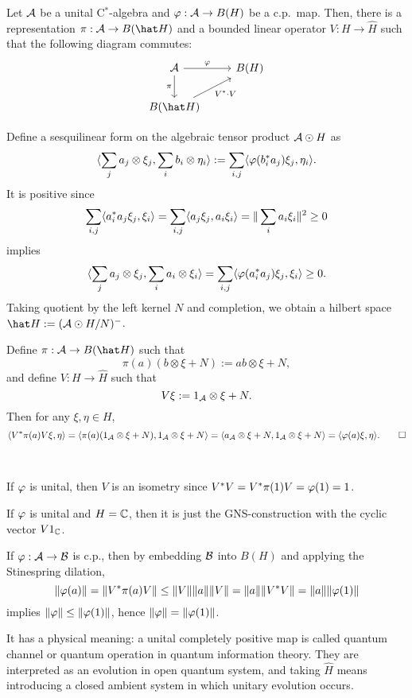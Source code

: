 \documentclass{../../small}
\begin{document}
\begin{thm}
Let $\mathcal{A}$ be a unital C$^*$-algebra and $\varphi:\mathcal{A}\to B(H)$ be a c.p.~map.
Then, there is a representation $\pi:\cA\to B(\hat H)$ and a bounded linear operator $V:H\to\hat H$ such that the following diagram commutes:
\[\begin{tikzcd}
\cA \ar{r}{\f} \ar[swap]{d}{\pi} & B(H) \\
B(\hat H) \ar[swap]{ur}{V^*\cdot V} &
\end{tikzcd}\]
\end{thm}
\begin{pf}
Define a sesquilinear form on the algebraic tensor product $\mathcal{A}\odot H$ as
\[\langle\sum_ja_j\otimes\xi_j,\sum_ib_i\otimes\eta_i\rangle:=\sum_{i,j}\langle\varphi(b_i^*a_j)\xi_j,\eta_i\rangle.\]
It is positive since
\[\sum_{i,j}\langle a_i^*a_j\xi_j,\xi_i\rangle=\sum_{i,j}\langle a_j\xi_j,a_i\xi_i\rangle=\|\sum_ia_i\xi_i\|^2\ge0\]
implies
\[\langle\sum_ja_j\otimes\xi_j,\sum_ia_i\otimes\xi_i\rangle=\sum_{i,j}\langle\varphi(a_i^*a_j)\xi_j,\xi_i\rangle\ge0.\]
Taking quotient by the left kernel $N$ and completion, we obtain a hilbert space $\hat H:=(\cA\odot H/N)^-$.

Define $\pi:\cA\to B(\hat H)$ such that
\[\pi(a)(b\otimes\xi+N):=ab\otimes\xi+N,\]
and define $V:H\to\hat H$ such that
\[V\xi:=1_{\mathcal{A}}\otimes\xi+N.\]
Then for any $\xi,\eta\in H$,
\[\langle V^*\pi(a)V\xi,\eta\rangle=\langle\pi(a)(1_{\mathcal{A}}\otimes\xi+N),1_{\mathcal{A}}\otimes\xi+N\rangle=\langle a_{\mathcal{A}}\otimes\xi+N,1_{\mathcal{A}}\otimes\xi+N\rangle=\langle\varphi(a)\xi,\eta\rangle.\qedhere\]
\end{pf}

\begin{rmk}\,
\begin{parts}
\item If $\varphi$ is unital, then $V$ is an isometry since $V^*V=V^*\pi(1)V=\varphi(1)=1$.
\item If $\varphi$ is unital and $H=\mathbb{C}$, then it is just the GNS-construction with the cyclic vector $V1_{\mathbb{C}}$.
\item If $\varphi:\mathcal{A}\to\mathcal{B}$ is c.p., then by embedding $\mathcal{B}$ into $B(H)$ and applying the Stinespring dilation,
\[\|\varphi(a)\|=\|V^*\pi(a)V\|\le\|V\|\|a\|\|V\|=\|a\|\|V^*V\|=\|a\|\|\varphi(1)\|\]
implies $\|\varphi\|\le\|\varphi(1)\|$, hence $\|\varphi\|=\|\varphi(1)\|$.
\item It has a physical meaning: a unital completely positive map is called quantum channel or quantum operation in quantum information theory. They are interpreted as an evolution in open quantum system, and taking $\hat H$ means introducing a closed ambient system in which unitary evolution occurs.
\end{parts}
\end{rmk}
\end{document}

